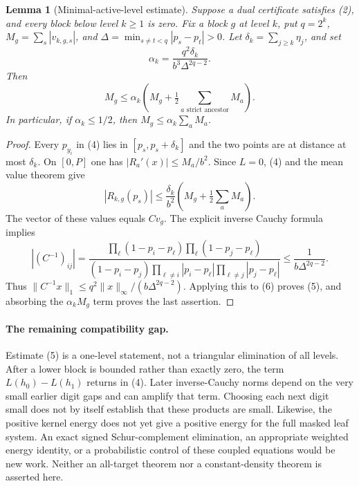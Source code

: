 \documentclass[11pt]{article}
\newtheorem{lemma}{Lemma}
\begin{document}
\begin{lemma}[Minimal-active-level estimate]
Suppose a dual certificate satisfies (2), and every block below level
$k\geq1$ is zero. Fix a block $g$ at level $k$, put $q=2^k$,
$M_g=\sum_s|v_{k,g,s}|$, and
$\Delta=\min_{s\ne t<q}|p_s-p_t|>0$.
Let $\delta_k=\sum_{j\geq k}\eta_j$, and set
\[
 \alpha_k=\frac{q^2\delta_k}{b^3\Delta^{2q-2}}.
\]
Then
\[
 M_g\leq\alpha_k\left(M_g+
                  \tfrac12\sum_{a\text{ strict ancestor}}M_a\right).
                                                               \tag{5}
\]
In particular, if $\alpha_k\leq1/2$, then
$M_g\leq\alpha_k\sum_aM_a$.
\end{lemma}
\begin{proof}
Every $p_{y_i}$ in (4) lies in $[p_s,p_s+\delta_k]$ and the two
points are at distance at most $\delta_k$.
On $[0,P]$ one has $|R_a'(x)|\leq M_a/b^2$.
Since $L=0$, (4) and the mean value theorem give
\[
 |R_{k,g}(p_s)|\leq\frac{\delta_k}{b^2}
       \left(M_g+\tfrac12\sum_aM_a\right).          \tag{6}
\]
The vector of these values equals $Cv_g$. The explicit inverse Cauchy
formula implies
\[
 |(C^{-1})_{ij}|
 =\frac{\prod_\ell(1-p_i-p_\ell)
             \prod_\ell(1-p_j-p_\ell)}
 {(1-p_i-p_j)\prod_{\ell\ne i}|p_i-p_\ell|
                  \prod_{\ell\ne j}|p_j-p_\ell|}
 \leq\frac1{b\Delta^{2q-2}}.
\]
Thus $\|C^{-1}x\|_1\leq q^2\|x\|_\infty/
(b\Delta^{2q-2})$. Applying this to (6) proves (5), and absorbing
the $\alpha_kM_g$ term proves the last assertion.
\end{proof}

\paragraph{The remaining compatibility gap.}
Estimate (5) is a one-level statement, not a triangular elimination of
all levels. After a lower block is bounded rather than exactly zero,
the term $L(h_0)-L(h_1)$ returns in (4). Later inverse-Cauchy norms
depend on the very small earlier digit gaps and can amplify that term.
Choosing each next digit small does not by itself establish that these
products are small. Likewise, the positive kernel energy does not yet
give a positive energy for the full masked leaf system.
An exact signed Schur-complement elimination, an appropriate weighted
energy identity, or a probabilistic control of these coupled equations
would be new work. Neither an all-target theorem nor a constant-density
theorem is asserted here.
\end{document}
